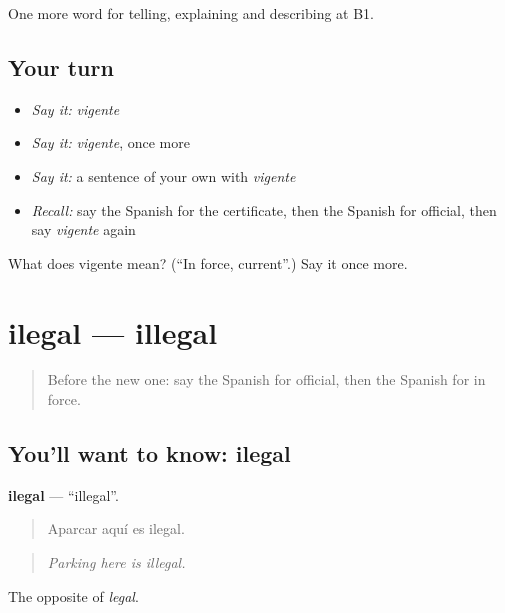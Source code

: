 \begin{grammarlens}[title={What you've built}]
One more word for telling, explaining and describing at B1.
\end{grammarlens}

\subsection*{Your turn}
\begin{itemize}
\raggedright
  \item \emph{Say it:} \emph{vigente}
  \item \emph{Say it:} \emph{vigente}, once more
  \item \emph{Say it:} a sentence of your own with \emph{vigente}
  \item \emph{Recall:} say the Spanish for the certificate, then the Spanish for official, then say \emph{vigente} again
\end{itemize}

\begin{tcolorbox}[breakable,colback=teal!4,colframe=teal!35!black,title={Before you move on}]
What does vigente mean? (\textquotedblleft{}In force, current\textquotedblright{}.) Say it once more.
\end{tcolorbox}
\section[ilegal]{ilegal — illegal}

\label{lesson:ES-C625-ilegal}



\begin{quote}
Before the new one: say the Spanish for official, then the Spanish for in force.
\end{quote}

\subsection*{You'll want to know: ilegal}
\textbf{ilegal} — \textquotedblleft{}illegal\textquotedblright{}.

\begin{quote}
Aparcar aquí es ilegal.
\end{quote}

\begin{quote}
\emph{Parking here is illegal.}
\end{quote}

The opposite of \emph{legal}.

